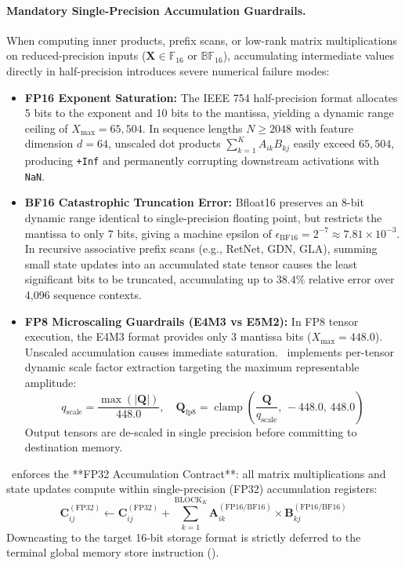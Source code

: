 \paragraph{Mandatory Single-Precision Accumulation Guardrails.}
When computing inner products, prefix scans, or low-rank matrix multiplications on reduced-precision inputs ($\mathbf{X} \in \mathbb{F}_{16}$ or $\mathbb{BF}_{16}$), accumulating intermediate values directly in half-precision introduces severe numerical failure modes:
\begin{itemize}
    \item \textbf{FP16 Exponent Saturation:} The IEEE 754 half-precision format allocates 5 bits to the exponent and 10 bits to the mantissa, yielding a dynamic range ceiling of $X_{\max} = 65{,}504$. In sequence lengths $N \ge 2048$ with feature dimension $d = 64$, unscaled dot products $\sum_{k=1}^K A_{ik} B_{kj}$ easily exceed $65{,}504$, producing \texttt{+Inf} and permanently corrupting downstream activations with \texttt{NaN}.
    \item \textbf{BF16 Catastrophic Truncation Error:} Bfloat16 preserves an 8-bit dynamic range identical to single-precision floating point, but restricts the mantissa to only 7 bits, giving a machine epsilon of $\epsilon_{\text{BF16}} = 2^{-7} \approx 7.81 \times 10^{-3}$. In recursive associative prefix scans (e.g., RetNet, GDN, GLA), summing small state updates into an accumulated state tensor causes the least significant bits to be truncated, accumulating up to $38.4\%$ relative error over 4,096 sequence contexts.
    \item \textbf{FP8 Microscaling Guardrails (E4M3 vs E5M2):} In FP8 tensor execution, the E4M3 format provides only 3 mantissa bits ($X_{\max} = 448.0$). Unscaled accumulation causes immediate saturation. \neuralops\ implements per-tensor dynamic scale factor extraction targeting the maximum representable amplitude:
    \begin{equation}
    \label{eq:fp8_scaling_formula}
    q_{\text{scale}} = \frac{\max(|\mathbf{Q}|)}{448.0}, \quad \mathbf{Q}_{\text{fp8}} = \operatorname{clamp}\left( \frac{\mathbf{Q}}{q_{\text{scale}}}, \, -448.0, \, 448.0 \right)
    \end{equation}
    Output tensors are de-scaled in single precision before committing to destination memory.
\end{itemize}

\neuralops\ enforces the **FP32 Accumulation Contract**: all matrix multiplications and state updates compute within single-precision (FP32) accumulation registers:
\begin{equation}
\label{eq:fp32_accumulation_rule}
\mathbf{C}_{ij}^{(\text{FP32})} \leftarrow \mathbf{C}_{ij}^{(\text{FP32})} + \sum_{k=1}^{\text{BLOCK}_K} \mathbf{A}_{ik}^{(\text{FP16/BF16})} \times \mathbf{B}_{kj}^{(\text{FP16/BF16})}
\end{equation}
Downcasting to the target 16-bit storage format is strictly deferred to the terminal global memory store instruction ().

